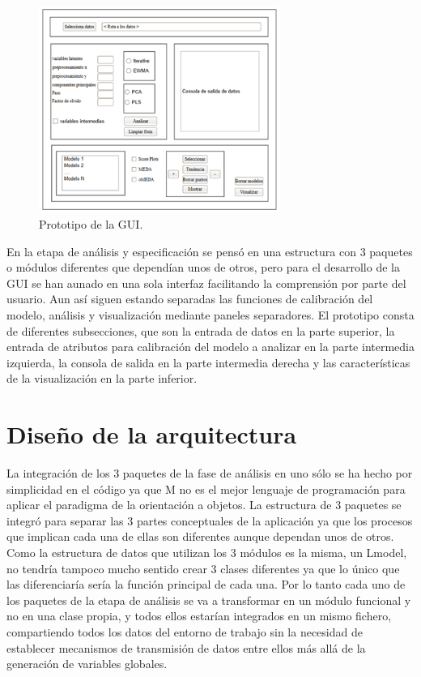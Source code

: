 \begin{figure}[H]
\centering
\includegraphics[width=0.7\textwidth]{imagenes/figuras/8_1.png}
\caption{Prototipo de la GUI.}
\end{figure}

\bigskip

En la etapa de análisis y especificación se pensó en una estructura con 3 paquetes o módulos diferentes que dependían unos de otros, pero para el desarrollo de la GUI se han aunado en una sola interfaz facilitando la comprensión por parte del usuario. Aun así siguen estando separadas las funciones de calibración del modelo, análisis y visualización mediante paneles separadores. El prototipo consta de diferentes subsecciones, que son la entrada de datos en la parte superior, la entrada de atributos para calibración del modelo a analizar en la parte intermedia izquierda, la consola de
salida en la parte intermedia derecha y las características de la visualización
en la parte inferior.
\bigskip

\section{Diseño de la arquitectura}

La integración de los 3 paquetes de la fase de análisis en uno sólo se ha hecho por simplicidad en el código ya que M no es el mejor lenguaje de programación para aplicar el paradigma de la orientación a objetos. La estructura de 3 paquetes se integró para separar las 3 partes conceptuales de la aplicación ya que los procesos que implican cada una de ellas son diferentes aunque dependan unos de otros. Como la estructura de datos que utilizan los 3 módulos es la misma, un Lmodel, no tendría tampoco mucho sentido crear 3 clases diferentes ya que lo único que las diferenciaría sería la función principal de cada una. Por lo tanto cada uno de los paquetes de la etapa de análisis se va a transformar en un módulo funcional y no en una clase propia, y todos ellos estarían integrados en un mismo fichero, compartiendo todos los datos del entorno de trabajo sin la necesidad de establecer mecanismos de transmisión de datos entre ellos más allá de la generación de variables globales.
\bigskip

